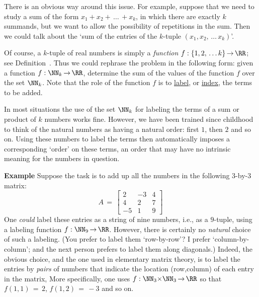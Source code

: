 {        There is an obvious way around this issue. For example, suppose that we need to study a sum of the form $x_{1}+x_{2}+\,{\ldots}\,+x_{k}$,
    in which there are exactly $k$ summands, but we want to allow the possibility of repetitions in the sum.
    Then we could talk about the `sum of the entries of the $k$-tuple $(x_{1},x_{2},\,{\ldots}\,x_{k})$'.

        Of course, a $k$-tuple of real numbers is simply a {\em function} $f:\{1,2,\,{\ldots}\,k\} \,{\rightarrow}\, {\RR}$; see Definition~.
    Thus we could rephrase the problem in the following form: given a function $f:{\NN}_{k} \,{\rightarrow}\, {\RR}$, determine the sum of the values of the function $f$ over the set ${\NN}_{k}$.
    Note that the role of the function $f$ is to \underline{label}, or \underline{index}, the terms to be added.

         In most situations the use of the set ${\NN}_{k}$ for labeling the terms of a sum or product of $k$ numbers works fine.
    However, we have been trained since childhood to think of the natural numbers as having a natural order: first $1$, then $2$ and so on.
    Using these numbers to label the terms then automatically imposes a corresponding `order' on these terms, an order that may have no intrinsic meaning for the numbers in question.

        {\bf Example} Suppose the task is to add up all the numbers in the following  $3$-by-$3$ matrix:
        \begin{displaymath}
        A \,=\, 
                \left[
        \begin{array}{rrr}
        2 & -3 & 4 \\
        4 &  2 & 7 \\
       -5 &  1 & 9
        \end{array}
                        \right]
        \end{displaymath}
    One {\em could} label these entries as a string of nine numbers, i.e., as a $9$-tuple, using a labeling function $f:{\NN}_{9} \,{\rightarrow}\, {\RR}$.
    However, there is certainly no {\em natural} choice of such a labeling. (You prefer to label them `row-by-row'? I prefer `column-by-column'; and the next person prefers to label them along diagonals.)
    Indeed, the obvious choice, and the one used in elementary matrix theory, is to label the entries by {\em pairs} of numbers that indicate the location (row,column) of each entry in the matrix,
    More specifically, one uses $f:{\NN}_{3}{\times}{\NN}_{3} \,{\rightarrow}\, {\RR}$ so that $f(1,1) \,=\, 2$, $f(1,2) \,=\, -3$ and so on.

}
